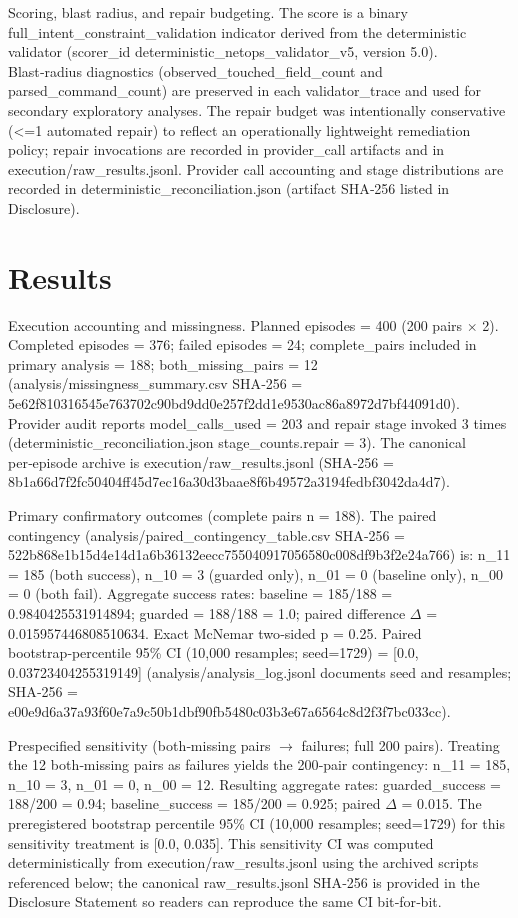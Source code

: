 \documentclass[conference]{IEEEtran}
\begin{document}
Scoring, blast radius, and repair budgeting. The score is a binary full\_intent\_constraint\_validation indicator derived from the deterministic validator (scorer\_id deterministic\_netops\_validator\_v5, version 5.0). Blast‑radius diagnostics (observed\_touched\_field\_count and parsed\_command\_count) are preserved in each validator\_trace and used for secondary exploratory analyses. The repair budget was intentionally conservative (<=1 automated repair) to reflect an operationally lightweight remediation policy; repair invocations are recorded in provider\_call artifacts and in execution/raw\_results.jsonl. Provider call accounting and stage distributions are recorded in deterministic\_reconciliation.json (artifact SHA‑256 listed in Disclosure).

\section{Results}
Execution accounting and missingness. Planned episodes = 400 (200 pairs \ensuremath{\times} 2). Completed episodes = 376; failed episodes = 24; complete\_pairs included in primary analysis = 188; both\_missing\_pairs = 12 (analysis/missingness\_summary.csv SHA‑256 = 5e62f810316545e763702c90bd9dd0e257f2dd1e9530ac86a8972d7bf44091d0). Provider audit reports model\_calls\_used = 203 and repair stage invoked 3 times (deterministic\_reconciliation.json stage\_counts.repair = 3). The canonical per‑episode archive is execution/raw\_results.jsonl (SHA‑256 = 8b1a66d7f2fc50404ff45d7ec16a30d3baae8f6b49572a3194fedbf3042da4d7).

Primary confirmatory outcomes (complete pairs n = 188). The paired contingency (analysis/paired\_contingency\_table.csv SHA‑256 = 522b868e1b15d4e14d1a6b36132eecc755040917056580c008df9b3f2e24a766) is: n\_11 = 185 (both success), n\_10 = 3 (guarded only), n\_01 = 0 (baseline only), n\_00 = 0 (both fail). Aggregate success rates: baseline = 185/188 = 0.9840425531914894; guarded = 188/188 = 1.0; paired difference \ensuremath{\Delta} = 0.015957446808510634. Exact McNemar two‑sided p = 0.25. Paired bootstrap‑percentile 95\% CI (10,000 resamples; seed=1729) = [0.0, 0.03723404255319149] (analysis/analysis\_log.jsonl documents seed and resamples; SHA‑256 = e00e9d6a37a93f60e7a9c50b1dbf90fb5480c03b3e67a6564c8d2f3f7bc033cc).

Prespecified sensitivity (both‑missing pairs \ensuremath{\rightarrow} failures; full 200 pairs). Treating the 12 both‑missing pairs as failures yields the 200‑pair contingency: n\_11 = 185, n\_10 = 3, n\_01 = 0, n\_00 = 12. Resulting aggregate rates: guarded\_success = 188/200 = 0.94; baseline\_success = 185/200 = 0.925; paired \ensuremath{\Delta} = 0.015. The preregistered bootstrap percentile 95\% CI (10,000 resamples; seed=1729) for this sensitivity treatment is [0.0, 0.035]. This sensitivity CI was computed deterministically from execution/raw\_results.jsonl using the archived scripts referenced below; the canonical raw\_results.jsonl SHA‑256 is provided in the Disclosure Statement so readers can reproduce the same CI bit‑for‑bit.
\end{document}
